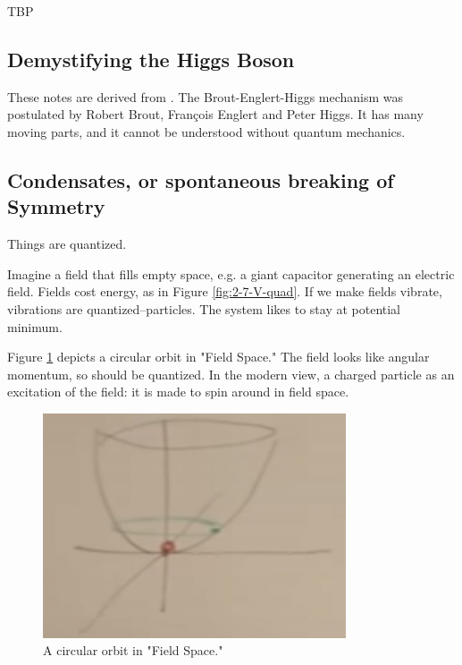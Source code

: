 \documentclass[]{article}
\begin{document}
TBP

\begin{appendices}
	\section{Demystifying the Higgs Boson}
	
	These notes are derived from \cite{susskind2010demystifing}.
	The  Brout-Englert-Higgs mechanism was postulated by Robert Brout, Fran\c{c}ois Englert and Peter Higgs. It has many moving parts, and it cannot be understood without quantum mechanics.
	
	\subsection{Condensates, or spontaneous breaking of Symmetry}
	
	Things are quantized.

	Imagine a field that fills empty space, e.g. a giant capacitor generating an electric field. Fields cost energy, as in Figure \ref{fig:2-7-V-quad}. If we make fields vibrate, vibrations are quantized--particles. The system likes to stay at potential minimum.
	
	Figure \ref{fig:2-appendix-field-circle} depicts a circular orbit in "Field Space." The field looks like angular momentum, so should be quantized. In the modern view,  a charged particle as an excitation of the field: it is made to spin around in field space.
	
	\begin{figure}[H]
		\caption{A circular orbit in "Field Space."}\label{fig:2-appendix-field-circle}
		\includegraphics[width=0.8\textwidth]{2-appendix-field-circle}
	\end{figure}
	

\end{appendices}
\end{document}
